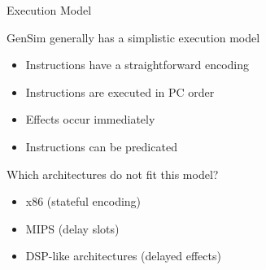 \begin{frame}{Execution Model}

\begin{minipage}[t][0.4\textheight]{\textwidth}
GenSim generally has a simplistic execution model
\begin{itemize}
	\item Instructions have a straightforward encoding
	\item Instructions are executed in PC order
	\item Effects occur immediately
	\item Instructions can be predicated
\end{itemize}
\end{minipage}

\pause

\begin{minipage}[t][0.4\textheight]{\textwidth}
Which architectures do not fit this model?
\begin{itemize}
	\item x86 (stateful encoding)
	\item MIPS (delay slots)
	\item DSP-like architectures (delayed effects)
\end{itemize}
\end{minipage}

\end{frame}
